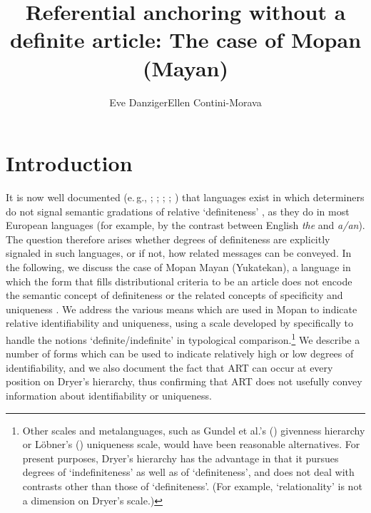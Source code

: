 \documentclass[output=paper]{langsci/langscibook}
\author{Eve Danziger\affiliation{University of Virginia}\lastand Ellen Contini-Morava\affiliation{University of Virginia}}
\title{Referential anchoring without a definite article: The case of Mopan (Mayan)}
\begin{document}
\maketitle

\section{Introduction}\label{3sec:1}
{
It is now well documented (e.\,g., \citealt{sasse:88}; \citealt{matthewson:98}; \citealt{gillon:09,gillon:13}; \citealt[][e201-e207]{davis:gillon:matthewson:14}; \citealt{lyon:15}) that languages exist in which determiners do not signal semantic gradations of relative `definiteness' \citep[degrees of identifiability and uniqueness, see][]{hawkins:78,lobner:85,lobner:11,lyons:99,dryer:14}, as they do in most European languages (for example, by the contrast between English {\emph{the}} and {\emph{a/an}}).  The question therefore arises whether degrees of definiteness are explicitly signaled in such languages, or if not, how related messages can be conveyed.  In the following, we discuss the case of Mopan Mayan (Yukatekan), a language in which the form that fills distributional criteria to be an article does not encode the semantic concept of definiteness or the related concepts of specificity and uniqueness \citep{contini:morava:danziger:fc}. We address the various means which are used in Mopan to indicate relative identifiability and uniqueness, using a scale developed by \cite{dryer:14} specifically to handle the notions `definite/indefinite' in typological comparison.\footnote{Other scales and metalanguages, such as Gundel et al.'s (\citeyear{gundel:hedberg:zacharski:93}) givenness hierarchy or L\"obner's (\citeyear{lobner:11}) uniqueness scale, would have been reasonable alternatives. For present purposes, Dryer's hierarchy has the advantage in that it pursues degrees of `indefiniteness' as well as of `definiteness', and does not deal with contrasts other than those of `definiteness'. (For example, `relationality' is not a dimension on Dryer's scale.)} We describe a number of forms which can be used to indicate relatively high or low degrees of identifiability, and we also document the fact that ART can occur at every position on Dryer's hierarchy, thus confirming that ART does not usefully convey information about identifiability or uniqueness.
}
\end{document}
